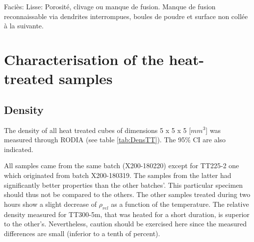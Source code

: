 Faciès: 
Lisse: Porosité, clivage ou manque de fusion. Manque de fusion reconnaissable via dendrites interrompues, boules de poudre et surface non collée à la suivante.



\section{Characterisation of the heat-treated samples}
\label{RCHTS}

\subsection{Density}
The density of all heat treated cubes of dimensions 5 x 5 x 5 [$mm^3$] was measured through RODIA (see table \ref{tab:DensTT}). The 95\% CI are also indicated.\\

 \begin{center}
\begin{table}[ht]
\noindent{}

\caption[RODIA relative density results for the heat treated cubes]{RODIA relative density results for the heat treated cubes}
\label{tab:densTT}
\end{table}
 \end{center}

All samples came from the same batch (X200-180220) except for TT225-2 one which originated from batch X200-180319. The samples from the latter had significantly better properties than the other batches'. This particular specimen should thus not be compared to the others. The other samples treated during two hours show a slight decrease of $\rho_{rel}$ as a function of the temperature. The relative density measured for TT300-5m, that was heated for a short duration, is superior to the other's. Nevertheless, caution should be exercised here since the measured differences are small (inferior to a tenth of percent). 

